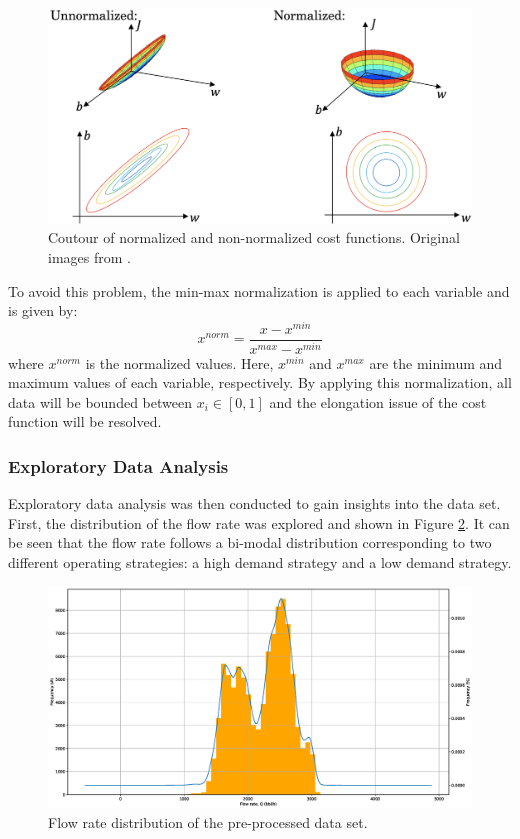 \begin{figure}[h]
    \centering
    \includegraphics[width=.8\textwidth]{images/08featscale.png}
    \caption{Coutour of normalized and non-normalized cost functions. Original images from \cite{deeplearning_course}.}
    \label{fig:08featscale}
\end{figure}

To avoid this problem, the min-max normalization is applied to each variable and is given by:
\begin{equation}
    x^{norm} = \frac{x - x^{min}}{x^{max} - x^{min}}
    \label{eq:08normalization}
\end{equation}
where $x^{norm}$ is the normalized values.  Here, $x^{min}$ and $x^{max}$ are the minimum and maximum values of each variable, respectively.  By applying this normalization, all data will be bounded between $x_i \in [0, 1]$ and the elongation issue of the cost function will be resolved.

\subsubsection{Exploratory Data Analysis}
Exploratory data analysis was then conducted to gain insights into the data set.  First, the distribution of the flow rate was explored and shown in Figure \ref{fig:08flowrate_dist}.  It can be seen that the flow rate follows a bi-modal distribution corresponding to two different operating strategies: a high demand strategy and a low demand strategy.

\begin{figure}[h]
    \centering
    \includegraphics[scale=0.35]{images/08Flowrate_KDE.eps}
    \caption{Flow rate distribution of the pre-processed data set.}
    \label{fig:08flowrate_dist}
\end{figure}

